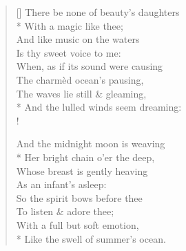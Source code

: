 \documentclass[MAIN]{subfiles}
\begin{document}
\settowidth{\versewidth}{There be none of beauty's daughters}
\begin{verse}[\versewidth]
There be none of beauty's daughters\\*
\vin With a magic like thee;\\
And like music on the waters\\
\vin Is thy sweet voice to me:\\
When, as if its sound were causing\\
The charm\`ed ocean's pausing,\\
The waves lie still \& gleaming,\\*
And the lulled winds seem dreaming:\\!

And the midnight moon is weaving\\*
\vin Her bright chain o'er the deep,\\
Whose breast is gently heaving\\
\vin As an infant's asleep:\\
So the spirit bows before thee\\
To listen \& adore thee;\\
With a full but soft emotion,\\*
Like the swell of summer's ocean.
\end{verse}
\end{document}
